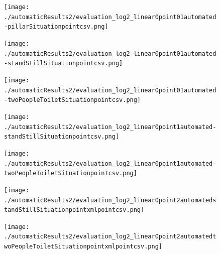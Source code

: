 \documentclass[11pt]{book}
\begin{document}
\begin{figure}
\centering
\texttt{[image: ./automaticResults2/evaluation\_log2\_linear0point01automated-pillarSituationpointcsv.png]}
\label{evaluation_log2_linear0point01automated-pillarSituationpointcsv}
\end{figure}
\clearpage

\begin{figure}
\centering
\texttt{[image: ./automaticResults2/evaluation\_log2\_linear0point01automated-standStillSituationpointcsv.png]}
\label{evaluation_log2_linear0point01automated-standStillSituationpointcsv}
\end{figure}

\begin{figure}
\centering
\texttt{[image: ./automaticResults2/evaluation\_log2\_linear0point01automated-twoPeopleToiletSituationpointcsv.png]}
\label{evaluation_log2_linear0point01automated-twoPeopleToiletSituationpointcsv}
\end{figure}

\begin{figure}
\centering
\texttt{[image: ./automaticResults2/evaluation\_log2\_linear0point1automated-standStillSituationpointcsv.png]}
\label{evaluation_log2_linear0point1automated-standStillSituationpointcsv}
\end{figure}

\begin{figure}
\centering
\texttt{[image: ./automaticResults2/evaluation\_log2\_linear0point1automated-twoPeopleToiletSituationpointcsv.png]}
\label{evaluation_log2_linear0point1automated-twoPeopleToiletSituationpointcsv}
\end{figure}

\begin{figure}
\centering
\texttt{[image: ./automaticResults2/evaluation\_log2\_linear0point2automatedstandStillSituationpointxmlpointcsv.png]}
\label{evaluation_log2_linear0point2automatedstandStillSituationpointxmlpointcsv}
\end{figure}

\begin{figure}
\centering
\texttt{[image: ./automaticResults2/evaluation\_log2\_linear0point2automatedtwoPeopleToiletSituationpointxmlpointcsv.png]}
\label{evaluation_log2_linear0point2automatedtwoPeopleToiletSituationpointxmlpointcsv}
\end{figure}
\clearpage
\end{document}
